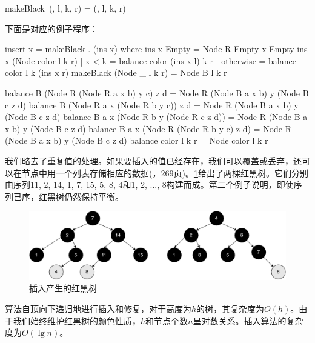 \documentclass[b5paper]{ctexart}
\begin{document}
\be
makeBlack\ (, l, k, r) = (, l, k, r)
\ee

下面是对应的例子程序：

\begin{Haskell}
insert x = makeBlack . (ins x) where
    ins x Empty = Node R Empty x Empty
    ins x (Node color l k r)
        | x < k     = balance color (ins x l) k r
        | otherwise = balance color l k (ins x r)
    makeBlack (Node _ l k r) = Node B l k r

balance B (Node R (Node R a x b) y c) z d = Node R (Node B a x b) y (Node B c z d)
balance B (Node R a x (Node R b y c)) z d = Node R (Node B a x b) y (Node B c z d)
balance B a x (Node R b y (Node R c z d)) = Node R (Node B a x b) y (Node B c z d)
balance B a x (Node R (Node R b y c) z d) = Node R (Node B a x b) y (Node B c z d)
balance color l k r = Node color l k r
\end{Haskell}

我们略去了重复值的处理。如果要插入的值已经存在，我们可以覆盖或丢弃，还可以在节点中用一个列表存储相应的数据(\cite{CLRS}，269页)。\cref{fig:insert-example}给出了两棵红黑树。它们分别由序列11, 2, 14, 1, 7, 15, 5, 8, 4和1, 2, ..., 8构建而成。第二个例子说明，即使序列已序，红黑树仍然保持平衡。

\begin{figure}[htbp]
  \centering
  \includegraphics[scale=0.5]{img/insert-haskell}
  \caption{插入产生的红黑树}
  \label{fig:insert-example}
\end{figure}

算法自顶向下递归地进行插入和修复，对于高度为$h$的树，其复杂度为$O(h)$。由于我们始终维护红黑树的颜色性质，$h$和节点个数$n$呈对数关系。插入算法的复杂度为$O(\lg n)$。

\begin{Exercise}\label{ex:rbt-insert-wo-pm}
\end{Exercise}
\end{document}
